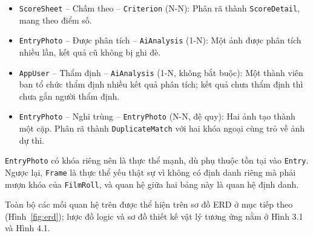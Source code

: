\begin{itemize}
    \item \texttt{ScoreSheet} -- Chấm theo -- \texttt{Criterion} (N-N): Phân rã thành \texttt{ScoreDetail}, mang theo điểm số.
    \item \texttt{EntryPhoto} -- Được phân tích -- \texttt{AiAnalysis} (1-N): Một ảnh được phân tích nhiều lần, kết quả cũ không bị ghi đè.
    \item \texttt{AppUser} -- Thẩm định -- \texttt{AiAnalysis} (1-N, không bắt buộc): Một thành viên ban tổ chức thẩm định nhiều kết quả phân tích; kết quả chưa thẩm định thì chưa gắn người thẩm định.
    \item \texttt{EntryPhoto} -- Nghi trùng -- \texttt{EntryPhoto} (N-N, đệ quy): Hai ảnh tạo thành một cặp. Phân rã thành \texttt{DuplicateMatch} với hai khóa ngoại cùng trỏ về ảnh dự thi.
\end{itemize}


\texttt{EntryPhoto} có khóa riêng nên là thực thể mạnh, dù phụ thuộc tồn tại vào \texttt{Entry}. Ngược lại, \texttt{Frame} là thực thể yếu thật sự vì không có định danh riêng mà phải mượn khóa của \texttt{FilmRoll}, và quan hệ giữa hai bảng này là quan hệ định danh.

Toàn bộ các mối quan hệ trên được thể hiện trên sơ đồ ERD ở mục tiếp theo (Hình~\ref{fig:erd}); lược đồ logic và sơ đồ thiết kế vật lý tương ứng nằm ở Hình 3.1 và Hình 4.1.

